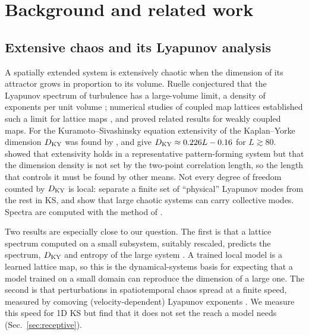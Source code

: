\section{Background and related work}
\label{sec:background}

\subsection{Extensive chaos and its Lyapunov analysis}
\label{sec:bg_extensive}

A spatially extended system is extensively chaotic when the dimension of
its attractor grows in proportion to its volume. Ruelle conjectured that
the Lyapunov spectrum of turbulence has a large-volume limit, a density of
exponents per unit volume \citep{ruelle1982}; numerical studies of
coupled map lattices established such a limit for lattice maps
\citep{livi1986,isola1990}, and \citet{bunimovichsinai1988} proved
related results for weakly coupled maps. For the Kuramoto--Sivashinsky
equation extensivity of the Kaplan--Yorke dimension $D_{\mathrm{KY}}$
\citep{kaplanyorke1979} was found by \citet{manneville1985}, and
\citet{edson2019} give $D_{\mathrm{KY}}\approx0.226L-0.16$ for $L\gtrsim80$.
\citet{egolfgreenside1994} showed that extensivity holds in a
representative pattern-forming system but that the dimension density is
not set by the two-point correlation length, so the length that controls
it must be found by other means. Not every degree of freedom counted by
$D_{\mathrm{KY}}$ is local: \citet{yang2009} separate a finite set of ``physical''
Lyapunov modes from the rest in KS, and \citet{takeuchi2009} show that
large chaotic systems can carry collective modes. Spectra are computed
with the method of \citet{benettin1980}.

Two results are especially close to our question. The first is that a
lattice spectrum computed on a small subsystem, suitably rescaled,
predicts the spectrum, $D_{\mathrm{KY}}$ and entropy of the large system
\citep{carretero1999}. A trained local model is a learned lattice map, so
this is the dynamical-systems basis for expecting that a model trained
on a small domain can reproduce the dimension of a large one. The second
is that perturbations in spatiotemporal chaos spread at a finite speed,
measured by comoving (velocity-dependent) Lyapunov exponents
\citep{kaneko1986,deisslerkaneko1987}. We measure this speed for 1D KS
but find that it does not set the reach a model needs
(Sec.~\ref{sec:receptive}).

